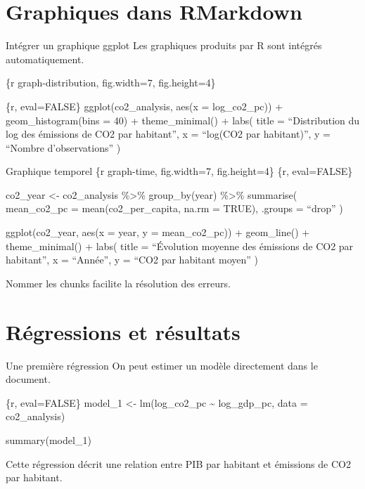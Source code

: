 \documentclass[
  10pt,
  ignorenonframetext,
]{beamer}
\begin{document}
\section{Graphiques dans RMarkdown}\label{graphiques-dans-rmarkdown}

\begin{frame}{Intégrer un graphique ggplot}
\label{intuxe9grer-un-graphique-ggplot}
Les graphiques produits par R sont intégrés automatiquement.

\{r graph-distribution, fig.width=7, fig.height=4\}

\{r, eval=FALSE\} ggplot(co2\_analysis, aes(x = log\_co2\_pc)) +
geom\_histogram(bins = 40) + theme\_minimal() + labs( title =
``Distribution du log des émissions de CO2 par habitant'', x = ``log(CO2
par habitant)'', y = ``Nombre d'observations'' )
\end{frame}

\begin{frame}{Graphique temporel}
\label{graphique-temporel}
\{r graph-time, fig.width=7, fig.height=4\} \{r, eval=FALSE\}

co2\_year \textless- co2\_analysis \%\textgreater\% group\_by(year)
\%\textgreater\% summarise( mean\_co2\_pc = mean(co2\_per\_capita, na.rm
= TRUE), .groups = ``drop'' )

ggplot(co2\_year, aes(x = year, y = mean\_co2\_pc)) + geom\_line() +
theme\_minimal() + labs( title = ``Évolution moyenne des émissions de
CO2 par habitant'', x = ``Année'', y = ``CO2 par habitant moyen'' )

Nommer les chunks facilite la résolution des erreurs.
\end{frame}

\section{Régressions et résultats}\label{ruxe9gressions-et-ruxe9sultats}

\begin{frame}{Une première régression}
\label{une-premiuxe8re-ruxe9gression}
On peut estimer un modèle directement dans le document.

\{r, eval=FALSE\} model\_1 \textless- lm(log\_co2\_pc \textasciitilde{}
log\_gdp\_pc, data = co2\_analysis)

summary(model\_1)

Cette régression décrit une relation entre PIB par habitant et émissions
de CO2 par habitant.
\end{frame}
\end{document}
